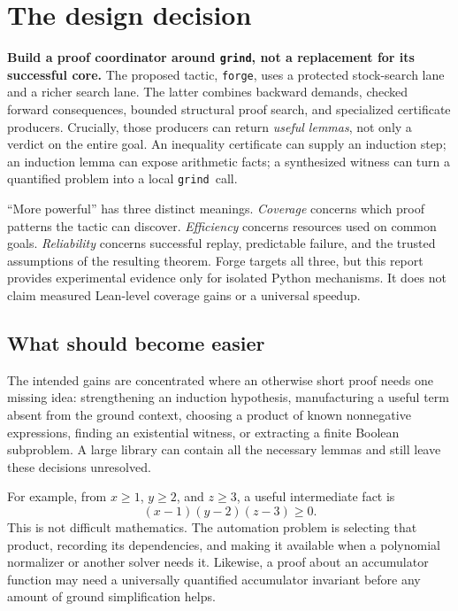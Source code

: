 \documentclass[11pt,a4paper]{article}
\newcommand{\grind}{\texttt{grind}}
\newcommand{\forge}{\texttt{forge}}
\begin{document}
\section{The design decision}

\textbf{Build a proof coordinator around \grind, not a replacement for its
successful core.} The proposed tactic, \forge, uses a protected stock-search
lane and a richer search lane. The latter combines backward demands, checked
forward consequences, bounded structural proof search, and specialized
certificate producers. Crucially, those producers can return \emph{useful
lemmas}, not only a verdict on the entire goal. An inequality certificate can
supply an induction step; an induction lemma can expose arithmetic facts;
a synthesized witness can turn a quantified problem into a local \grind\ call.

``More powerful'' has three distinct meanings. \emph{Coverage} concerns which
proof patterns the tactic can discover. \emph{Efficiency} concerns resources
used on common goals. \emph{Reliability} concerns successful replay, predictable
failure, and the trusted assumptions of the resulting theorem. Forge targets
all three, but this report provides experimental evidence only for isolated
Python mechanisms. It does not claim measured Lean-level coverage gains or a
universal speedup.

\subsection{What should become easier}

The intended gains are concentrated where an otherwise short proof needs one
missing idea: strengthening an induction hypothesis, manufacturing a useful
term absent from the ground context, choosing a product of known nonnegative
expressions, finding an existential witness, or extracting a finite Boolean
subproblem. A large library can contain all the necessary lemmas and still
leave these decisions unresolved.

For example, from $x\geq 1$, $y\geq 2$, and $z\geq 3$, a useful intermediate
fact is
\[
 (x-1)(y-2)(z-3)\geq0.
\]
This is not difficult mathematics. The automation problem is selecting that
product, recording its dependencies, and making it available when a polynomial
normalizer or another solver needs it. Likewise, a proof about an accumulator
function may need a universally quantified accumulator invariant before any
amount of ground simplification helps.
\end{document}
